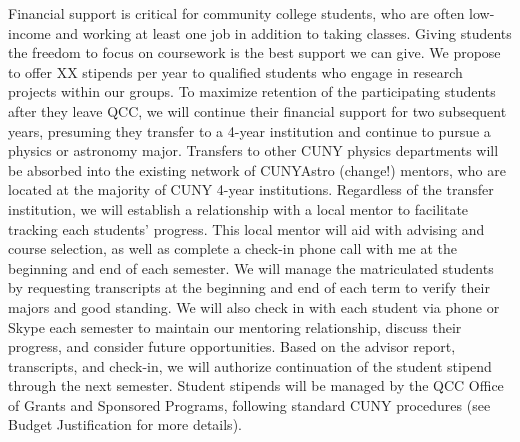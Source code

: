 \documentclass[12pt]{article}
\begin{document}



Financial support is critical for community college students, who are often low-income and working at least one job in addition to taking classes.  Giving students the freedom to focus on coursework is the best support we can give.  We propose to offer XX stipends per year to qualified students who engage in research projects within our groups.  To maximize retention of the participating students after they leave QCC, we will continue their financial support for two subsequent years, presuming they transfer to a 4-year institution and continue to pursue a physics or astronomy major.  Transfers to other CUNY physics departments will be absorbed into the existing network of CUNYAstro (change!) mentors, who are located at the majority of CUNY 4-year institutions.  Regardless of the transfer institution, we will establish a relationship with a local mentor to facilitate tracking each students' progress.  This local mentor will aid with advising and course selection, as well as complete a check-in phone call with me at the beginning and end of each semester.  We will manage the matriculated students by requesting transcripts at the beginning and end of each term to verify their majors and good standing.  We will also check in with each student via phone or Skype each semester to maintain our mentoring relationship, discuss their progress, and consider future opportunities.  Based on the advisor report, transcripts, and check-in, we will authorize continuation of the student stipend through the next semester.  Student stipends will be managed by the QCC Office of Grants and Sponsored Programs, following standard CUNY procedures (see Budget Justification for more details).
\end{document}
